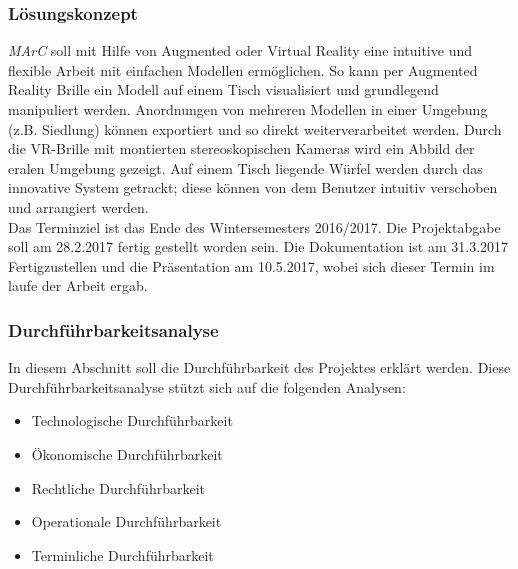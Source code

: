 \subsubsection{Lösungskonzept}
\textit{MArC} soll mit Hilfe von Augmented oder Virtual Reality eine intuitive und flexible Arbeit mit einfachen Modellen ermöglichen. So kann per Augmented Reality Brille ein Modell auf einem Tisch visualisiert und grundlegend manipuliert werden. 
Anordnungen von mehreren Modellen in einer Umgebung (z.B. Siedlung) können exportiert und so direkt weiterverarbeitet werden.
Durch die VR-Brille mit montierten stereoskopischen Kameras wird ein Abbild der eralen Umgebung gezeigt. Auf einem Tisch liegende Würfel werden durch das innovative System getrackt; diese können von dem Benutzer intuitiv verschoben und arrangiert werden. \\
Das Terminziel ist das Ende des Wintersemesters 2016/2017. Die Projektabgabe soll am 28.2.2017 fertig gestellt worden sein. Die Dokumentation ist am 31.3.2017 Fertigzustellen und die Präsentation am 10.5.2017, wobei sich dieser Termin im laufe der Arbeit ergab.

 
\subsubsection{Durchführbarkeitsanalyse}
In diesem Abschnitt soll die Durchführbarkeit des Projektes erklärt werden. Diese Durchführbarkeitsanalyse stützt sich auf die folgenden Analysen:
\begin{itemize}
	\item Technologische Durchführbarkeit
	\item  Ökonomische Durchführbarkeit
	\item Rechtliche Durchführbarkeit
	\item  Operationale Durchführbarkeit
	\item  Terminliche Durchführbarkeit
\end{itemize}

